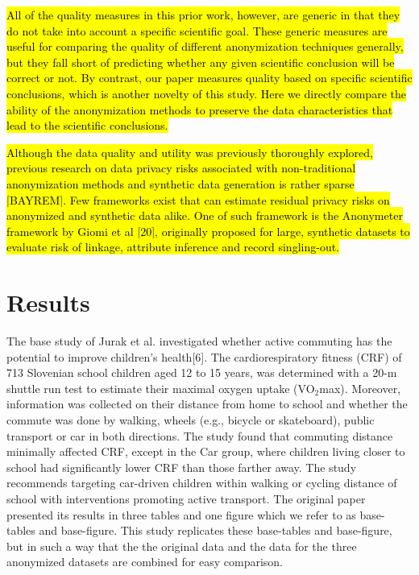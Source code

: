 \documentclass[10pt]{article}
\newcommand{\mycite}[1]{[#1]}
\begin{document}
\hl{All of the quality measures in this prior work, however, are generic in that they do not take into account a specific scientific goal. These generic measures are useful for comparing the quality of different anonymization techniques generally, but they fall short of predicting whether any given scientific conclusion will be correct or not. By contrast, our paper measures quality based on specific scientific conclusions, which is another novelty of this study. Here we directly compare the ability of the anonymization methods to preserve the data characteristics that lead to the scientific conclusions.}

\hl{Although the data quality and utility was previously thoroughly explored, previous research on data privacy risks associated with non-traditional anonymization methods and synthetic data generation is rather sparse [BAYREM]. Few frameworks exist that can estimate residual privacy risks on anonymized and synthetic data alike. One of such framework is the Anonymeter framework by Giomi et al \mycite{20}, originally proposed for large, synthetic datasets to evaluate risk of linkage, attribute inference and record singling-out. 
}

  

\section*{Results}

The base study of Jurak et al. investigated whether active commuting has the potential to improve children’s health\mycite{6}. The cardiorespiratory fitness (CRF) of 713 Slovenian school children aged 12 to 15 years, was determined with a 20-m shuttle run test to estimate their maximal oxygen uptake (VO$_2$max). Moreover, information was collected on their distance from home to school and whether the commute was done by walking, wheels (e.g., bicycle or skateboard), public transport or car in both directions. The study found that commuting distance minimally affected CRF, except in the Car group, where children living closer to school had significantly lower CRF than those farther away. The study recommends targeting car-driven children within walking or cycling distance of school with interventions promoting active transport. The original paper presented its results in three tables and one figure which we refer to as base-tables and base-figure. This study replicates these base-tables and base-figure, but in such a way that the the original data and the data for the three anonymized datasets are combined for easy comparison.
\end{document}
